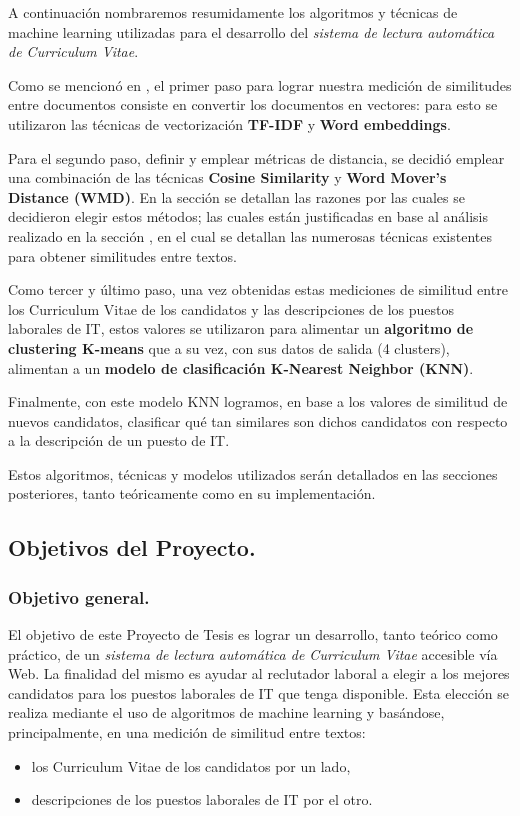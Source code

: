 \documentclass[12pt,a4paper]{article}
\begin{document}
\begin{sloppypar}
A continuación nombraremos resumidamente los algoritmos y técnicas de machine learning utilizadas para el desarrollo del \textit{sistema de lectura automática de Curriculum Vitae}. 

Como se mencionó en \textit{}, el primer paso para lograr nuestra medición de similitudes entre documentos consiste en convertir los documentos en vectores: para esto se utilizaron las técnicas de vectorización \textbf{TF-IDF} y \textbf{Word embeddings}.

Para el segundo paso, definir y emplear métricas de distancia, se decidió emplear una combinación de las técnicas \textbf{Cosine Similarity} y \textbf{Word Mover’s Distance (WMD)}. En la sección \textit{} se detallan las razones por las cuales se decidieron elegir estos métodos; las cuales están justificadas en base al análisis realizado en la sección \textit{}, en el cual se detallan las numerosas técnicas existentes para obtener similitudes entre textos.

Como tercer y último paso, una vez obtenidas estas mediciones de similitud entre los Curriculum Vitae de los candidatos y las descripciones de los puestos laborales de IT, estos valores se utilizaron para alimentar un \textbf{algoritmo de clustering K-means} que a su vez, con sus datos de salida (4 clusters), alimentan a un \textbf{modelo de clasificación K-Nearest Neighbor (KNN)}.

Finalmente, con este modelo KNN logramos, en base a los valores de similitud de nuevos candidatos, clasificar qué tan similares son dichos candidatos con respecto a la descripción de un puesto de IT.

Estos algoritmos, técnicas y modelos utilizados serán detallados en las secciones posteriores, tanto teóricamente como en su implementación. 

\cleardoublepage    %

\subsection{Objetivos del Proyecto.}

\subsubsection{Objetivo general.}

El objetivo de este Proyecto de Tesis es lograr un desarrollo, tanto teórico como práctico, de un \textit{sistema de lectura automática de Curriculum Vitae} accesible vía Web. La finalidad del mismo es ayudar al reclutador laboral a elegir a los mejores candidatos para los puestos laborales de IT que tenga disponible. Esta elección se realiza mediante el uso de algoritmos de machine learning y basándose, principalmente, en una medición de similitud entre textos:  
\begin{itemize}
\item los Curriculum Vitae de los candidatos por un lado, 
\item descripciones de los puestos laborales de IT por el otro.
\end{itemize} 


\end{sloppypar}
\end{document}
